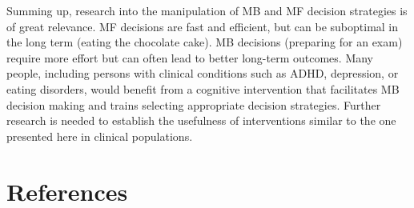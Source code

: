 \documentclass[11pt]{article} %
\begin{document}

Summing up, research into the manipulation of MB and MF decision strategies is of great relevance. MF decisions are fast and efficient, but can be suboptimal in the long term (eating the chocolate cake). MB decisions (preparing for an exam) require more effort but can often lead to better long-term outcomes. Many people, including persons with clinical conditions such as ADHD, depression, or eating disorders, would benefit from a cognitive intervention that facilitates MB decision making and trains selecting appropriate decision strategies. Further research is needed to establish the usefulness of interventions similar to the one presented here in clinical populations.

\section{References}

\printbibliography
\end{document}
